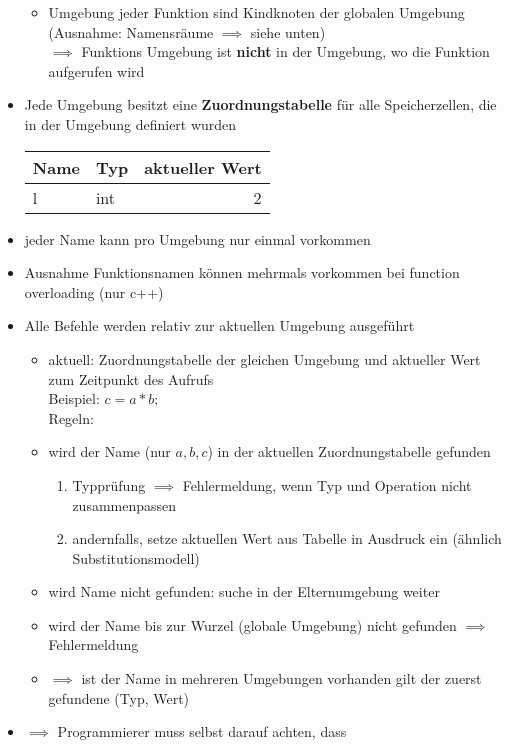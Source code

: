 \documentclass[a4paper]{scrartcl}
\theoremstyle{definition}
\theoremstyle{plain}
\theoremstyle{remark}
\theoremstyle{remark}
\begin{document}
\begin{itemize}
\begin{itemize}
\item Umgebung jeder Funktion sind Kindknoten der globalen Umgebung (Ausnahme: Namensräume $\implies$ siehe unten) \\
      $\implies$ Funktions Umgebung ist \textbf{nicht} in der Umgebung, wo die Funktion aufgerufen wird
\end{itemize}
\item Jede Umgebung besitzt eine \textbf{Zuordnungstabelle} für alle Speicherzellen, die in der Umgebung definiert wurden
\begin{center}
\begin{tabular}{llr}
Name & Typ & aktueller Wert\\
\hline
l & int & 2\\
\end{tabular}
\end{center}
\item jeder Name kann pro Umgebung nur einmal vorkommen
\item Ausnahme Funktionsnamen können mehrmals vorkommen bei function overloading (nur c++)
\item Alle Befehle werden relativ zur aktuellen Umgebung ausgeführt
\begin{itemize}
\item aktuell: Zuordnungstabelle der gleichen Umgebung und aktueller Wert zum Zeitpunkt des Aufrufs \\
      Beispiel: $c = a * b;$ \\
      Regeln:
\item wird der Name (nur $a, b, c$) in der aktuellen Zuordnungstabelle gefunden
\begin{enumerate}
\item Typprüfung $\implies$ Fehlermeldung, wenn Typ und Operation nicht zusammenpassen
\item andernfalls, setze aktuellen Wert aus Tabelle in Ausdruck ein (ähnlich Substitutionsmodell)
\end{enumerate}
\item wird Name nicht gefunden: suche in der Elternumgebung weiter
\item wird der Name bis zur Wurzel (globale Umgebung) nicht gefunden $\implies$ Fehlermeldung
\item $\implies$ ist der Name in mehreren Umgebungen vorhanden gilt der zuerst gefundene (Typ, Wert)
\end{itemize}
\item $\implies$ Programmierer muss selbst darauf achten, dass

\end{itemize}
\end{document}
